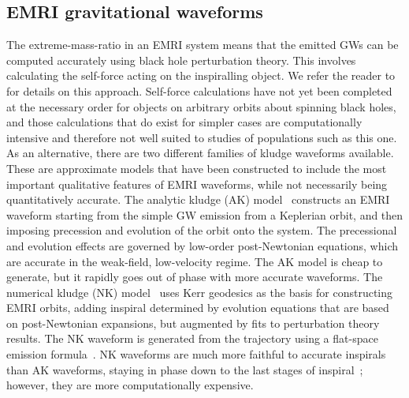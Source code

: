 \documentclass[a4paper]{jpconf}
\begin{document}
\subsection{EMRI gravitational waveforms}
The extreme-mass-ratio in an EMRI system means that the emitted GWs can be computed accurately using black hole perturbation theory. This involves calculating the self-force acting on the inspiralling object. We refer the reader to~\cite{poissonLRR} for details on this approach. Self-force calculations have not yet been completed at the necessary order for objects on arbitrary orbits about spinning black holes, and those calculations that do exist for simpler cases are computationally intensive and therefore not well suited to studies of populations such as this one. As an alternative, there are two different families of kludge waveforms available. These are approximate models that have been constructed to include the most important qualitative features of EMRI waveforms, while not necessarily being quantitatively accurate. The analytic kludge (AK) model~\cite{AK} constructs an EMRI waveform starting from the simple GW emission from a Keplerian orbit, and then imposing precession and evolution of the orbit onto the system. The precessional and evolution effects are governed by low-order post-Newtonian equations, which are accurate in the weak-field, low-velocity regime. The AK model is cheap to generate, but it rapidly goes out of phase with more accurate waveforms. The numerical kludge (NK) model~\cite{GG06,NK07} uses Kerr geodesics as the basis for constructing EMRI orbits, adding inspiral determined by evolution equations that are based on post-Newtonian expansions, but augmented by fits to perturbation theory results. The NK waveform is generated from the trajectory using a flat-space emission formula~\cite{NK07}. NK waveforms are much more faithful to accurate inspirals than AK waveforms, staying in phase down to the last stages of inspiral~\cite{NK07}; however, they are more computationally expensive.
\end{document}
